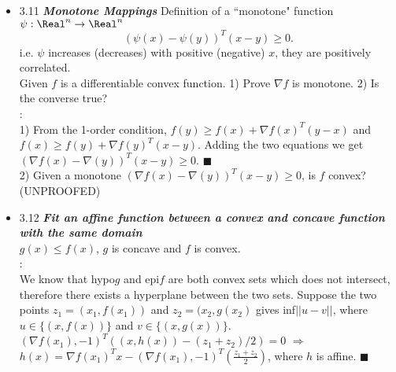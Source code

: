 \begin{itemize}
\item 3.11 {\bf\emph{Monotone Mappings}}   Definition of a ``monotone" function $\psi: \Real^n
\rightarrow \Real^n$ 
\begin{equation} 
   (\psi(x)-\psi(y))^T(x-y) \ge 0.  
\end{equation} 
i.e. $\psi$ increases (decreases) with positive (negative) $x$, they are positively correlated. \\

   Given $f$ is a differentiable convex function. 1) Prove $\nabla f$ is monotone. 2) Is the
converse true? \\
   
   \Proof: \\ 1) From the 1-order condition, $f(y) \ge f(x) + \nabla f(x)^T(y-x)$ and $f(x) \ge f(y)
+ \nabla f(y)^T(x-y)$.  Adding the two equations we get $(\nabla f(x)-\nabla(y))^T(x-y) \ge 0$.
$\blacksquare$ \\
  
   2) Given a monotone $(\nabla f(x)-\nabla(y))^T(x-y) \ge 0$, is $f$ convex?  (UNPROOFED)

\item 3.12 {\bf\emph{Fit an affine function between a convex and concave function with the same
domain}} \\ $g(x) \le f(x)$, $g$ is concave and $f$ is convex. \\ \Proof: \\ We know that hypo$g$
and epi$f$ are both convex sets which does not intersect, therefore there exists a hyperplane
between the two sets.  Suppose the two points $z_1=(x_1,f(x_1))$ and $z_2=(x_2,g(x_2)$ gives
inf$||u-v||$, where $u \in \{(x,f(x))\}$ and $v \in \{(x,g(x))\}$.  $(\nabla f(x_1),-1)^T
((x,h(x))-(z_1+z_2)/2)=0$ $\Rightarrow$ $h(x)= \nabla f(x_1)^Tx- (\nabla
f(x_1),-1)^T(\frac{z_1+z_2}{2})$, where $h$ is affine.  $\blacksquare$


\end{itemize}
